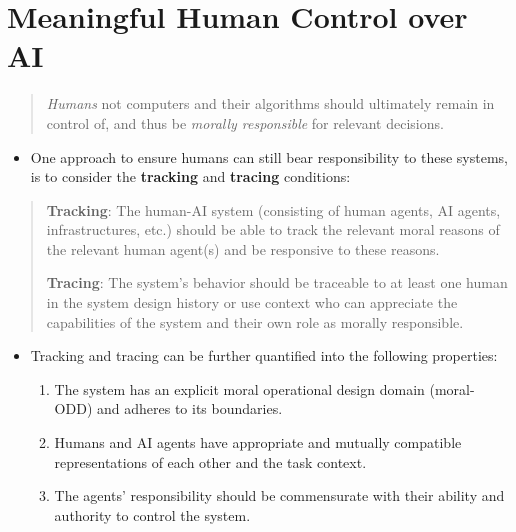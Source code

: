 \documentclass[
]{book}
\providecommand{\tightlist}{%
  \setlength{\itemsep}{0pt}\setlength{\parskip}{0pt}}
\begin{document}
\hypertarget{meaningful-human-control-over-ai}{%
\section{Meaningful Human Control over
AI}\label{meaningful-human-control-over-ai}}

\begin{quote}
\emph{Humans} not computers and their algorithms should ultimately
remain in control of, and thus be \emph{morally responsible} for
relevant decisions.
\end{quote}

\begin{itemize}
\tightlist
\item
  One approach to ensure humans can still bear responsibility to these
  systems, is to consider the \textbf{tracking} and \textbf{tracing}
  conditions:
\end{itemize}

\begin{quote}
\textbf{Tracking}: The human-AI system (consisting of human agents, AI
agents, infrastructures, etc.) should be able to track the relevant
moral reasons of the relevant human agent(s) and be responsive to these
reasons.

\textbf{Tracing}: The system's behavior should be traceable to at least
one human in the system design history or use context who can appreciate
the capabilities of the system and their own role as morally
responsible.
\end{quote}

\begin{itemize}
\tightlist
\item
  Tracking and tracing can be further quantified into the following
  properties:

  \begin{enumerate}
  \def\labelenumi{\arabic{enumi}.}
  \tightlist
  \item
    The system has an explicit moral operational design domain
    (moral-ODD) and adheres to its boundaries.
  \item
    Humans and AI agents have appropriate and mutually compatible
    representations of each other and the task context.
  \item
    The agents' responsibility should be commensurate with their ability
    and authority to control the system.
  \end{enumerate}
\end{itemize}
\end{document}
